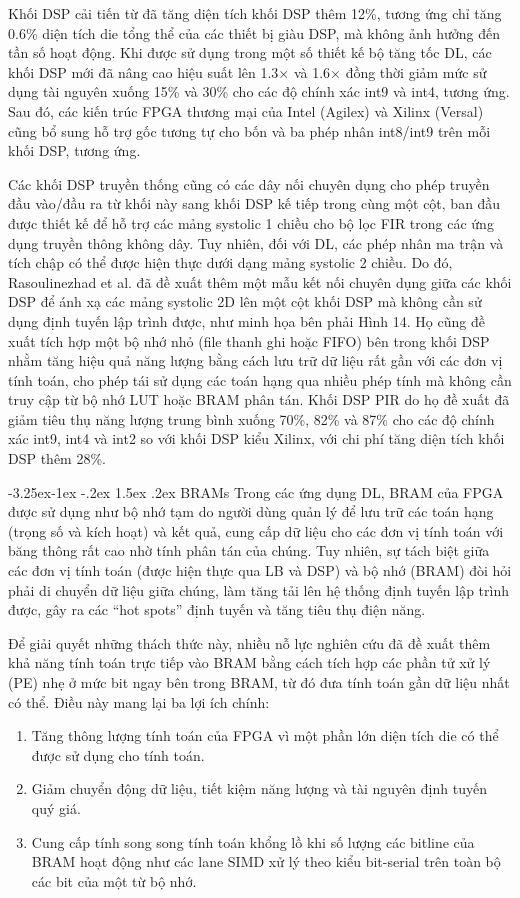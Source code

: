 \documentclass[a4paper]{article}
\makeatletter
\newcounter {subsubsubsection}[subsubsection]
\newcommand\subsubsubsection{\@startsection{subsubsubsection}{4}{\z@}%
                                     {-3.25ex\@plus -1ex \@minus -.2ex}%
                                     {1.5ex \@plus .2ex}%
                                     {\normalfont\normalsize\bfseries}}
\makeatother
\begin{document}
Khối DSP cải tiến từ đã tăng diện tích khối DSP thêm 12\%, tương ứng chỉ tăng 0.6\% diện tích die tổng thể của các thiết bị giàu DSP, mà không ảnh hưởng đến tần số hoạt động. Khi được sử dụng trong một số thiết kế bộ tăng tốc DL, các khối DSP mới đã nâng cao hiệu suất lên 1.3× và 1.6× đồng thời giảm mức sử dụng tài nguyên xuống 15\% và 30\% cho các độ chính xác int9 và int4, tương ứng. Sau đó, các kiến trúc FPGA thương mại của Intel (Agilex) và Xilinx (Versal) cũng bổ sung hỗ trợ gốc tương tự cho bốn và ba phép nhân int8/int9 trên mỗi khối DSP, tương ứng.

Các khối DSP truyền thống cũng có các dây nối chuyên dụng cho phép truyền đầu vào/đầu ra từ khối này sang khối DSP kế tiếp trong cùng một cột, ban đầu được thiết kế để hỗ trợ các mảng systolic 1 chiều cho bộ lọc FIR trong các ứng dụng truyền thông không dây. Tuy nhiên, đối với DL, các phép nhân ma trận và tích chập có thể được hiện thực dưới dạng mảng systolic 2 chiều. Do đó, Rasoulinezhad et al. đã đề xuất thêm một mẫu kết nối chuyên dụng giữa các khối DSP để ánh xạ các mảng systolic 2D lên một cột khối DSP mà không cần sử dụng định tuyến lập trình được, như minh họa bên phải Hình 14. Họ cũng đề xuất tích hợp một bộ nhớ nhỏ (file thanh ghi hoặc FIFO) bên trong khối DSP nhằm tăng hiệu quả năng lượng bằng cách lưu trữ dữ liệu rất gần với các đơn vị tính toán, cho phép tái sử dụng các toán hạng qua nhiều phép tính mà không cần truy cập từ bộ nhớ LUT hoặc BRAM phân tán. Khối DSP PIR do họ đề xuất đã giảm tiêu thụ năng lượng trung bình xuống 70\%, 82\% và 87\% cho các độ chính xác int9, int4 và int2 so với khối DSP kiểu Xilinx, với chi phí tăng diện tích khối DSP thêm 28\%.

\subsubsubsection{BRAMs}
Trong các ứng dụng DL, BRAM của FPGA được sử dụng như bộ nhớ tạm do người dùng quản lý để lưu trữ các toán hạng (trọng số và kích hoạt) và kết quả, cung cấp dữ liệu cho các đơn vị tính toán với băng thông rất cao nhờ tính phân tán của chúng. Tuy nhiên, sự tách biệt giữa các đơn vị tính toán (được hiện thực qua LB và DSP) và bộ nhớ (BRAM) đòi hỏi phải di chuyển dữ liệu giữa chúng, làm tăng tải lên hệ thống định tuyến lập trình được, gây ra các “hot spots” định tuyến và tăng tiêu thụ điện năng.

Để giải quyết những thách thức này, nhiều nỗ lực nghiên cứu đã đề xuất thêm khả năng tính toán trực tiếp vào BRAM bằng cách tích hợp các phần tử xử lý (PE) nhẹ ở mức bit ngay bên trong BRAM, từ đó đưa tính toán gần dữ liệu nhất có thể. Điều này mang lại ba lợi ích chính:
\begin{enumerate}
    \item Tăng thông lượng tính toán của FPGA vì một phần lớn diện tích die có thể được sử dụng cho tính toán.
    \item Giảm chuyển động dữ liệu, tiết kiệm năng lượng và tài nguyên định tuyến quý giá.
    \item Cung cấp tính song song tính toán khổng lồ khi số lượng các bitline của BRAM hoạt động như các lane SIMD xử lý theo kiểu bit-serial trên toàn bộ các bit của một từ bộ nhớ.
\end{enumerate}
\end{document}
